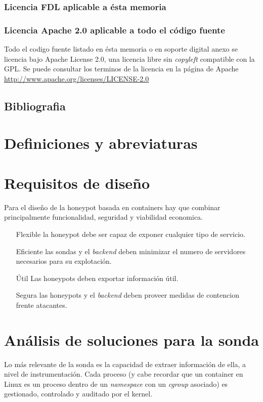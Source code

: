 \subsubsection{Licencia FDL aplicable a ésta memoria}

\subsubsection{Licencia Apache 2.0 aplicable a todo el código fuente}
Todo el codigo fuente listado en ésta memoria o en soporte digital anexo se licencia bajo Apache License 2.0, una licencia libre sin \emph{copyleft} compatible con la GPL.
Se puede consultar los terminos de la licencia en la página de Apache \url{http://www.apache.org/licenses/LICENSE-2.0}

\subsection{Bibliografia}
\printbibliography[title={Referencias},heading=none]
\nopagebreak
\section{Definiciones y abreviaturas}
\section{Requisitos de diseño}

Para el diseño de la honeypot basada en containers hay que combinar principalmente funcionalidad, seguridad y viabilidad economica.

\begin{enumerate}
    \item[Flexible] la honeypot debe ser capaz de exponer cualquier tipo de servicio.
    \item[Eficiente] las sondas y el \emph{backend} deben minimizar el numero de servidores necesarios para su explotación.
    \item[Útil] Las honeypots deben exportar información útil.
    \item[Segura] las honeypots y el \emph{backend} deben proveer medidas de contencion frente atacantes.  
\end{enumerate}


\section{Análisis de soluciones para la sonda}

Lo más relevante de la sonda es la capacidad de extraer información de ella, a nivel de instrumentación. Cada proceso (y cabe recordar que un container en Linux es un proceso dentro de un \emph{namespace} con un \emph{cgroup} asociado) es gestionado, controlado
y auditado por el kernel.

